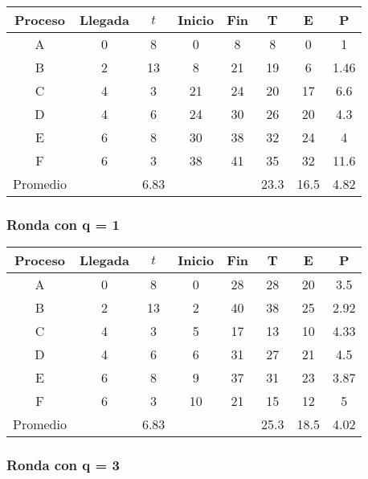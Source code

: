 \documentclass[11pt]{article}
\begin{document}
\begin{center}
\begin{tabular}{|c|c|c|c|c|c|c|c|}
    \hline
    Proceso & Llegada & $t$ & Inicio & Fin & T & E & P \\
    \hline
    A & 0 & 8 & 0 & 8 & 8 & 0 & 1 \\
    \hline
    B & 2 & 13 & 8 & 21 & 19 & 6 & 1.46 \\
    \hline
    C & 4 & 3 & 21 & 24 & 20 & 17 & 6.6 \\
    \hline
    D & 4 & 6 & 24 & 30 & 26 & 20 & 4.3 \\
    \hline
    E & 6 & 8 & 30 & 38 & 32 & 24 & 4 \\
    \hline
    F & 6 & 3 & 38 & 41 & 35 & 32 & 11.6 \\ 
    \hline
    Promedio & & 6.83 & & & 23.3 & 16.5 & 4.82 \\
    \hline
\end{tabular}
\end{center}

\subsubsection*{Ronda con q = 1}

\begin{center}
    \begin{tabular}{|c|c|c|c|c|c|c|c|}
        \hline
        Proceso & Llegada & $t$ & Inicio & Fin & T & E & P \\
        \hline
        A & 0 & 8 & 0 & 28 & 28 & 20 & 3.5 \\
        \hline
        B & 2 & 13 & 2 & 40 & 38 & 25 & 2.92 \\
        \hline
        C & 4 & 3 & 5 & 17 & 13 & 10 & 4.33 \\
        \hline
        D & 4 & 6 & 6 & 31 & 27 & 21 & 4.5 \\
        \hline
        E & 6 & 8 & 9 & 37 & 31 & 23 & 3.87 \\
        \hline
        F & 6 & 3 & 10 & 21 & 15 & 12 & 5 \\ 
        \hline
        Promedio & & 6.83 & & & 25.3 & 18.5 & 4.02  \\
        \hline
    \end{tabular}
\end{center}

\subsubsection*{Ronda con q = 3}
\end{document}
